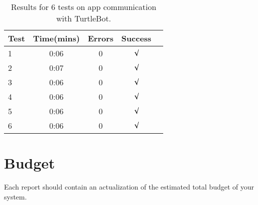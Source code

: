 \documentclass{article}
\begin{document}
\begin{table}[h]
    \vskip 3mm
    \begin{center}
    \begin{small}
    \begin{sc}
    \begin{tabular}{lcccr}
    \hline
    \abovespace\belowspace
    Test  & Time(mins) & Errors & Success \\
    \hline
    1    & 0:06 & 0 & $\surd$ \\
    2    & 0:07 & 0 & $\surd$\\
    3    & 0:06 & 0 & $\surd$ \\
    4    & 0:06 & 0 & $\surd$\\
    5    & 0:06 & 0 & $\surd$\\
    6    & 0:06 & 0 & $\surd$ \\
    \hline
    \end{tabular}
    \end{sc}
    \end{small}
    \caption{Results for 6 tests on app communication with TurtleBot.}
    \label{tab:sample-table}
    \end{center}
    \vskip -3mm
\end{table}

\section{Budget}
Each report should contain an actualization of the estimated total budget 
of your system.








\end{document}
